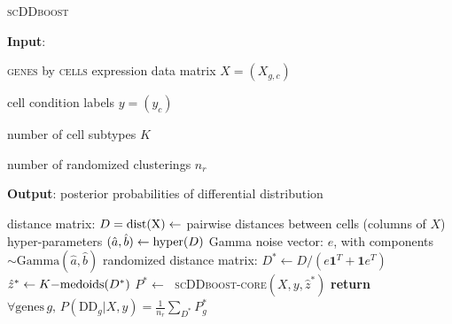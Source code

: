 \documentclass[11pt]{amsart}
\begin{document}



\begin{algorithm}
\caption{\textsc{scDDboost}}\label{alg:scDDboost}
\raggedright\hspace*{\algorithmicindent} \textbf{Input}: \begin{list}{}{}
 \item  \textsc{genes} by \textsc{cells} expression data matrix $X=(X_{g,c})$
 \item  cell condition labels $y=(y_c)$
 \item  number of cell subtypes $K$
 \item number of randomized clusterings $n_r$ 
 \end{list}
\hspace*{\algorithmicindent} \textbf{Output}: posterior probabilities of differential distribution 
\begin{algorithmic}[2]
\State distance matrix: $D=\rm{dist}(X) \gets$ pairwise distances between cells (columns of $X$)
\State hyper-parameters $(\hat a, \hat b) \gets {\mbox {\rm hyper}}(D)$
\Repeat
\State Gamma noise vector: $e$, with components $\sim \text{Gamma}(\hat a,\hat b)$
\State randomized distance matrix: $D^* \gets D / (e\textbf{1}^T +  \textbf{1}e^T)$
\State $\hat z^* \gets {\mbox {\rm $K-$medoids}}(D^*)$
\State $P^* \gets\;$ \textsc{scDDboost-core}$(X,y,\hat z^*)$
\State \textbf{return} $\forall \text{genes} \, g, \, P(\text{DD}_g|X,y) = \frac{1}{n_r} 
   \sum_{D^*} P^*_g$
\EndProcedure
\end{algorithmic}
\end{algorithm}
\end{document}
